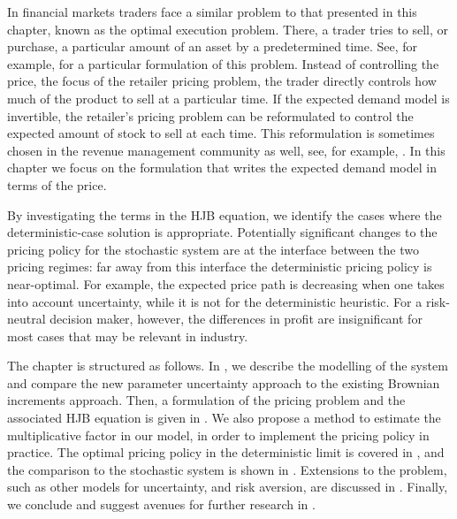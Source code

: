 \documentclass[main.tex]{subfiles}
\begin{document}
In financial markets traders face a similar problem to
that presented in this chapter, known as the optimal execution
problem. There, a trader tries to sell, or purchase,
a particular amount of an asset by a predetermined time. See, for example,
\citet{predoiu2011optimal} for a particular formulation of this problem.
Instead of controlling the price, the focus of the retailer pricing
problem, the trader directly controls how much
of the product to sell at a particular time. If the expected demand
model is invertible, the retailer's pricing problem can be
reformulated to control the expected amount of stock to sell at each
time. This reformulation is sometimes chosen in the revenue management
community as well, see, for example, \citet{bitran2003overview}.
In this chapter we focus on the formulation that writes the expected
demand model in terms of the price.

By investigating the terms in the HJB equation,
we identify the cases where the deterministic-case solution is appropriate.
Potentially significant changes to the
pricing policy for the stochastic system are at the interface between
the two pricing regimes: far away from this interface the
deterministic pricing policy is near-optimal. For example, the
expected price path is decreasing when one takes into account
uncertainty, while it is not for the deterministic heuristic.
For a risk-neutral decision maker, however, the differences in profit
are insignificant for most cases that may be relevant in industry.


The chapter is structured as follows. In , we
describe the modelling of the system and compare the new parameter uncertainty
approach to the existing Brownian increments approach.
Then, a formulation of the pricing problem and the associated HJB
equation is given in . We also propose
a method to estimate the multiplicative factor in our model, in
order to implement the pricing policy in practice.
The optimal pricing policy in the deterministic limit is covered in
, and the comparison to the stochastic
system is shown in .
Extensions to the problem, such as other models for uncertainty, and
risk aversion, are discussed in .
Finally, we conclude and
suggest avenues for further research in .
\end{document}
